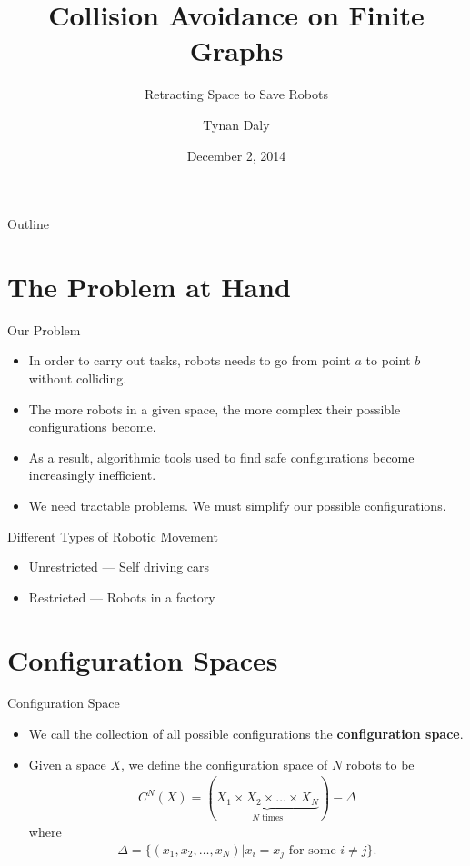 \documentclass{beamer}
\title{Collision Avoidance on Finite Graphs}
\subtitle{Retracting Space to Save Robots}
\author{Tynan Daly}
\institute[Bates College]
\date{December 2, 2014}
\begin{document}
\begin{frame}
  \titlepage
\end{frame}

\begin{frame}{Outline}
  \tableofcontents
\end{frame}


\section{The Problem at Hand}
\begin{frame}{Our Problem}
\begin{itemize}
\item In order to carry out tasks, robots needs to go from point $a$ to point $b$ without colliding.\pause
\item The more robots in a given space, the more complex their possible configurations become.\pause
\item As a result, algorithmic tools used to find safe configurations become increasingly inefficient.\pause
\item We need tractable problems. We must simplify our possible configurations. 
\end{itemize}
\end{frame}

\begin{frame}{Different Types of Robotic Movement}
  \begin{itemize}
  \item Unrestricted --- Self driving cars\pause
  
  \item Restricted --- Robots in a factory
  \end{itemize}
\end{frame}

\section{Configuration Spaces}

\begin{frame}{Configuration Space}
\begin{itemize}
\item We call the collection of all possible configurations the \textbf{configuration space}.
\item Given a space $X$, we define the configuration space of $N$ robots to be \pause
\begin{align*}
C^N(X)=(\underbrace{X_1\times X_2 \times\dots \times X_N}_{N \text{ times}}) - \Delta
\end{align*}
\pause 
where 
\begin{align*}
\Delta = \{ (x_1,x_2,\dots,x_N)| x_i=x_j \text{ for some } i\neq j\}.
\end{align*}
\end{itemize}
\end{frame}
\end{document}
